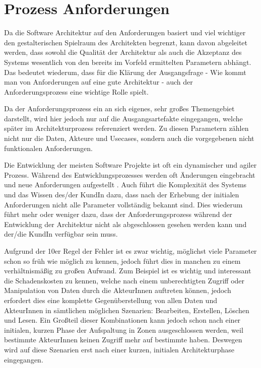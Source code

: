 \chapter{Prozess Anforderungen}
Da die Software Architektur auf den Anforderungen basiert und viel wichtiger \glqq den gestalterischen Spielraum des Architekten\grqq \cite[S. 103]{softarch} begrenzt, kann davon abgeleitet werden, dass sowohl die Qualität der Architektur als auch die Akzeptanz des Systems wesentlich von den bereits im Vorfeld ermittelten Parametern abhängt. Das bedeutet wiederum, dass für die Klärung der Ausgangsfrage - Wie kommt man von Anforderungen auf eine gute Architektur - auch der Anforderungsprozess eine wichtige Rolle spielt.

Da der Anforderungsprozess ein an sich eigenes, sehr großes Themengebiet darstellt, wird hier jedoch nur auf die Ausgangsartefakte eingegangen, welche später im Architekturprozess referenziert werden. Zu diesen Parametern zählen nicht nur die Daten, Akteure und Usecases, sondern auch die vorgegebenen nicht funktionalen Anforderungen.

Die Entwicklung der meisten Software Projekte ist oft ein dynamischer und agiler Prozess. Während des Entwicklungsprozesses werden oft Änderungen eingebracht und neue Anforderungen aufgestellt  \cite[S. 6-7, S. 37]{effektiv}. Auch führt die Komplexität des Systems und das Wissen des/der KundIn dazu, dass nach der Erhebung der initialen Anforderungen nicht alle Parameter vollständig bekannt sind. Dies wiederum führt mehr oder weniger dazu, dass der Anforderungsprozess während der Entwicklung der Architektur nicht als abgeschlossen gesehen werden kann und der/die KundIn verfügbar sein muss.

Aufgrund der 10er Regel der Fehler \cite[S. 154]{fehler} ist es zwar wichtig, möglichst viele Parameter schon so früh wie möglich zu kennen, jedoch führt dies in manchen zu einem verhältnismäßig zu großen Aufwand. Zum Beispiel ist es wichtig und interessant die Schadenskosten zu kennen, welche nach einem unberechtigten Zugriff oder Manipulation von Daten durch die AkteurInnen auftreten können, jedoch erfordert dies eine komplette Gegenüberstellung von allen Daten und AkteurInnen in sämtlichen möglichen Szenarien: Bearbeiten, Erstellen, Löschen und Lesen. Ein Großteil dieser Kombinationen kann jedoch schon nach einer initialen, kurzen Phase der Aufspaltung in Zonen ausgeschlossen werden, weil bestimmte AkteurInnen keinen Zugriff mehr auf bestimmte haben. Deswegen wird auf diese Szenarien erst nach einer kurzen, initialen Architekturphase eingegangen.

